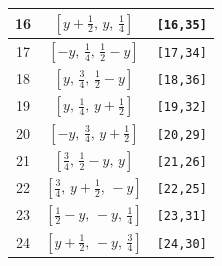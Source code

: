 \documentclass[fleqn,8pt]{jsarticle}
\begin{document}
\begin{longtable}{ccc}
16 & $\left[ y + \frac{1}{2},\, y,\, \frac{1}{4} \right]$ & {\tt [16,35]} \\ \hline
17 & $\left[ - y,\, \frac{1}{4},\, \frac{1}{2} - y \right]$ & {\tt [17,34]} \\ \hline
18 & $\left[ y,\, \frac{3}{4},\, \frac{1}{2} - y \right]$ & {\tt [18,36]} \\ \hline
19 & $\left[ y,\, \frac{1}{4},\, y + \frac{1}{2} \right]$ & {\tt [19,32]} \\ \hline
20 & $\left[ - y,\, \frac{3}{4},\, y + \frac{1}{2} \right]$ & {\tt [20,29]} \\ \hline
21 & $\left[ \frac{3}{4},\, \frac{1}{2} - y,\, y \right]$ & {\tt [21,26]} \\ \hline
22 & $\left[ \frac{3}{4},\, y + \frac{1}{2},\, - y \right]$ & {\tt [22,25]} \\ \hline
23 & $\left[ \frac{1}{2} - y,\, - y,\, \frac{1}{4} \right]$ & {\tt [23,31]} \\ \hline
24 & $\left[ y + \frac{1}{2},\, - y,\, \frac{3}{4} \right]$ & {\tt [24,30]} \\
\end{longtable}
\renewcommand{\arraystretch}{1.2}
\end{document}
